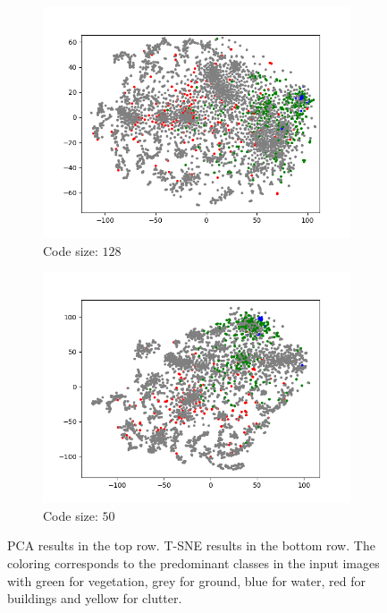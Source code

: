 \begin{figure}[H]
\begin{subfigure}{.25\textwidth}
        \includegraphics[width=\textwidth]{images/figures/experiments_latent/convolutional_dim128_classes.png}   
        \caption{Code size: $128$}
    \end{subfigure}%
    \begin{subfigure}{.25\textwidth}
        \centering
        \includegraphics[width=\textwidth]{images/figures/experiments_latent/convolutional_dim50_classes.png}
        \caption{Code size: $50$}
    \end{subfigure}
    \caption{PCA results in the top row. 
    T-SNE results in the bottom row. 
    The coloring corresponds to the predominant classes in the input images with green for vegetation, 
    grey for ground, blue for water, red for buildings and yellow for clutter.}
\end{figure} \label{figure_classes_convolutional}

